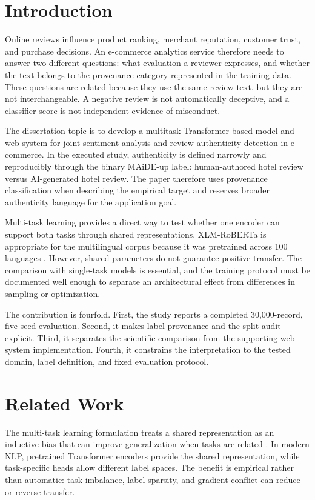 \documentclass[11pt,a4paper]{article}
\begin{document}
\section{Introduction}

Online reviews influence product ranking, merchant reputation, customer
trust, and purchase decisions. An e-commerce analytics service therefore
needs to answer two different questions: what evaluation a reviewer
expresses, and whether the text belongs to the provenance category
represented in the training data. These questions are related because
they use the same review text, but they are not interchangeable. A
negative review is not automatically deceptive, and a classifier score
is not independent evidence of misconduct.

The dissertation topic is to develop a multitask Transformer-based model
and web system for joint sentiment analysis and review authenticity
detection in e-commerce. In the executed study, authenticity is defined
narrowly and reproducibly through the binary MAiDE-up label:
human-authored hotel review versus AI-generated hotel review. The paper
therefore uses provenance classification when describing the empirical
target and reserves broader authenticity language for the application
goal.

Multi-task learning provides a direct way to test whether one encoder
can support both tasks through shared representations. XLM-RoBERTa is
appropriate for the multilingual corpus because it was pretrained across
100 languages \citep{conneau2020xlmr}. However, shared parameters do not guarantee
positive transfer. The comparison with single-task models is essential,
and the training protocol must be documented well enough to separate an
architectural effect from differences in sampling or optimization.

The contribution is fourfold. First, the study reports a completed
30,000-record, five-seed evaluation. Second, it makes label provenance
and the split audit explicit. Third, it separates the scientific
comparison from the supporting web-system implementation. Fourth, it
constrains the interpretation to the tested domain, label definition,
and fixed evaluation protocol.

\section{Related Work}

The multi-task learning formulation treats a shared representation as an
inductive bias that can improve generalization when tasks are related
\citep{caruana1997multitask}. In modern NLP, pretrained Transformer encoders provide the
shared representation, while task-specific heads allow different label
spaces. The benefit is empirical rather than automatic: task imbalance,
label sparsity, and gradient conflict can reduce or reverse transfer.
\end{document}
